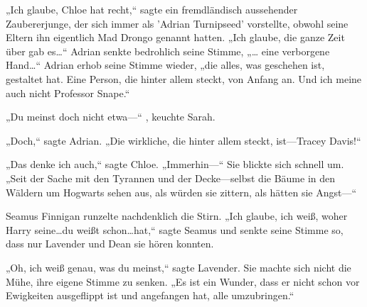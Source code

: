 „Ich glaube, Chloe hat recht,“ sagte ein fremdländisch aussehender Zaubererjunge, der sich immer als 'Adrian Turnipseed' vorstellte, obwohl seine Eltern ihn eigentlich Mad Drongo genannt hatten. „Ich glaube, die ganze Zeit über gab es…“ Adrian senkte bedrohlich seine Stimme, „… eine verborgene Hand…“ Adrian erhob seine Stimme wieder, „die alles, was geschehen ist, gestaltet hat. Eine Person, die hinter allem steckt, von Anfang an. Und ich meine auch nicht Professor Snape.“

„Du meinst doch nicht etwa—“ , keuchte Sarah.

„Doch,“ sagte Adrian. „Die wirkliche, die hinter allem steckt, ist—Tracey Davis!“

„Das denke ich auch,“ sagte Chloe. „Immerhin—“ Sie blickte sich schnell um. „Seit der Sache mit den Tyrannen und der Decke—selbst die Bäume in den Wäldern um Hogwarts sehen aus, als würden sie zittern, als hätten sie Angst—“

Seamus Finnigan runzelte nachdenklich die Stirn. „Ich glaube, ich weiß, woher Harry seine…du weißt schon…hat,“ sagte Seamus und senkte seine Stimme so, dass nur Lavender und Dean sie hören konnten.

„Oh, ich weiß genau, was du meinst,“ sagte Lavender. Sie machte sich nicht die Mühe, ihre eigene Stimme zu senken. „Es ist ein Wunder, dass er nicht schon vor Ewigkeiten ausgeflippt ist und angefangen hat, alle umzubringen.“

